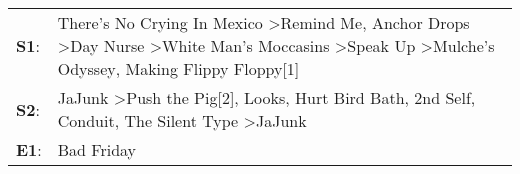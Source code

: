 \begin{supertabular}{p{0.03\textwidth}p{0.92\textwidth}}
 \textbf{S1}:  &  There's No Crying In Mexico\textsuperscript{} \textgreater \enspace Remind Me\textsuperscript{}, \enspace Anchor Drops\textsuperscript{} \textgreater \enspace Day Nurse\textsuperscript{} \textgreater \enspace White Man's Moccasins\textsuperscript{} \textgreater \enspace Speak Up\textsuperscript{} \textgreater \enspace Mulche's Odyssey\textsuperscript{}, \enspace Making Flippy Floppy[1]\textsuperscript{}  \enspace  \\
 \textbf{S2}:  &                                                                                       JaJunk\textsuperscript{} \textgreater \enspace Push the Pig[2]\textsuperscript{}, \enspace Looks\textsuperscript{}, \enspace Hurt Bird Bath\textsuperscript{}, \enspace 2nd Self\textsuperscript{}, \enspace Conduit\textsuperscript{}, \enspace The Silent Type\textsuperscript{} \textgreater \enspace JaJunk\textsuperscript{}  \enspace  \\
 \textbf{E1}:  &                                                                                                                                                                                                                                                                                                                                                                                            Bad Friday\textsuperscript{}  \enspace  \\
\end{supertabular}
